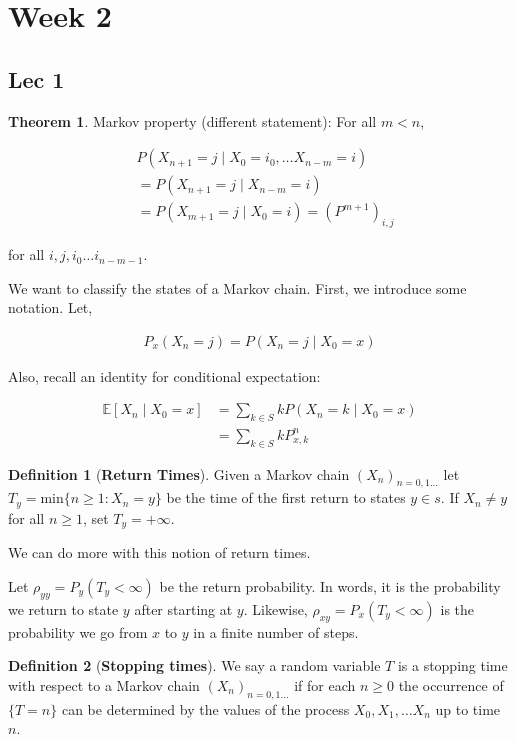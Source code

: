 \documentclass[12pt]{article}
\theoremstyle{definition}
\newtheorem{definition}{Definition}[section]
\newtheorem{theorem}{Theorem}[section]
\begin{document}
\section{Week 2}
\subsection{Lec 1}


\begin{theorem}{Markov property (different statement):}
  For all $m< n$,

  \begin{align*}
    &P(X_{n+1} = j \mid X_0 = i_0, \dots X_{n-m} = i) \\
    &= P(X_{n+1} = j \mid X_{n-m} = i) \\
    &= P(X_{m+1} = j \mid X_0 = i) = (P^{m+1})_{i,j}
  \end{align*}

  for all $i,j, i_0 \dots i_{n-m-1}$.
\end{theorem}

We want to classify the states of a Markov chain. First, we introduce some notation. Let,

\begin{align*}
  P_x(X_n = j) = P(X_n = j \mid X_0 = x)
\end{align*}

Also, recall an identity for conditional expectation:

\begin{align*}
  \mathbb{E}[X_n \mid X_0 = x] &= \sum_{k \in S} k P(X_n = k \mid X_0 = x) \\
  &= \sum_{k \in S} k P_{x,k}^n
\end{align*}


\begin{definition}[\textbf{Return Times}]
  Given a Markov chain $(X_n)_{n = 0,1...}$ let $T_y = \text{min}\{n \geq 1: X_n = y\}$ be the time of the first return to states $y \in s$. If $X_n \ne y $ for all $n \geq 1$, set $T_y = + \infty$.
\end{definition}

We can do more with this notion of return times.

Let $\rho_{yy} = P_y(T_y < \infty)$ be the return probability. In words, it is the probability we return to state $y$ after starting at $y$. Likewise, $\rho_{xy} = P_x(T_y < \infty)$ is the probability we go from $x$ to $y$ in a finite number of steps.


\begin{definition}[\textbf{Stopping times}]
  We say a random variable $T$ is a stopping time with respect to a Markov chain $(X_n)_{n = 0,1 \dots}$ if for each $n \geq 0$ the occurrence of $\{T = n\}$ can be determined by the values of the process $X_0, X_1, \dots X_n$ up to time $n$.
\end{definition}
\end{document}
